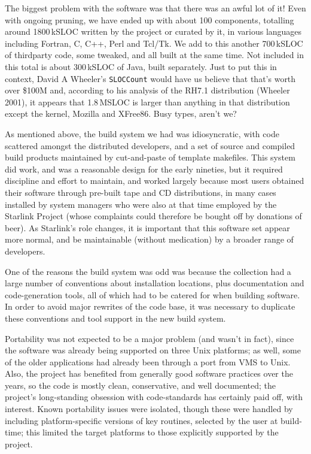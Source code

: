 \documentclass[11pt,twoside]{article}
\begin{document}
The biggest problem with the software was that there was an awful lot
of it!  Even with ongoing pruning, we have ended up with about 100
components, totalling around 1800\,kSLOC written by the project or
curated by it, in various languages
including Fortran, C, C++, Perl and Tcl/Tk.  We add to this another
700\,kSLOC of thirdparty code, some tweaked, and all built at the same
time.  Not included in this total is about 300\,kSLOC of Java,
built separately.  Just to put this in context, David A
Wheeler's \texttt{SLOCCount} would have us believe that that's worth
over \$100M and, according to his analysis of the RH7.1 distribution
(Wheeler 2001), it appears that 1.8\,MSLOC is larger than anything in
that distribution except the kernel, Mozilla and XFree86.  Busy types,
aren't we?

As mentioned above, the build system we had was idiosyncratic, with
code scattered amongst the distributed developers, and a set of source
and compiled build products maintained by cut-and-paste of template
makefiles.  This system did work, and was a reasonable design for the
early nineties, but it required discipline and effort to maintain, and
worked largely because most users obtained their software through
pre-built tape and CD distributions, in many cases installed by system
managers who were also at that time employed by the Starlink Project
(whose complaints could therefore be bought off by donations of beer).
As Starlink's role changes, it is important that this software set
appear more normal, and be maintainable (without medication) by a
broader range of developers.

One of the reasons the build system was odd was because the collection
had a large number of conventions about installation locations, plus
documentation and code-generation tools, all of which had to be
catered for when building software.  In order to avoid major rewrites
of the code base, it was necessary to duplicate these conventions and
tool support in the new build system.

Portability was not expected to be a major problem (and wasn't in
fact), since the software was already being supported on three Unix
platforms; as well, some of the older applications had already been
through a port from VMS to Unix.  Also, the project has benefited from
generally good software practices over the years, so the code is
mostly clean, conservative, and well documented; the project's
long-standing obsession with code-standards has certainly paid off,
with interest.  Known portability issues were isolated, though these
were handled by including platform-specific versions of key routines,
selected by the user at build-time; this limited the target platforms
to those explicitly supported by the project.
\end{document}
